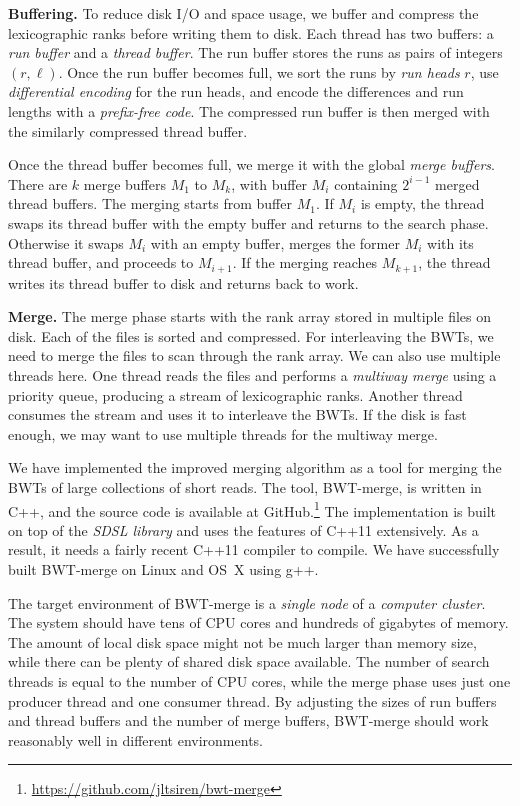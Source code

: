 \documentclass[smallabstract,smallcaptions]{dccpaper}
\newcommand{\BWT}{\textsf{BWT}}
\newcommand{\BWTmerge}{\textsf{BWT\nobreakdash-merge}}
\begin{document}
\smallbreak\noindent\textbf{Buffering.} To reduce disk I/O and space usage, we buffer and compress the lexicographic ranks before writing them to disk. Each thread has two buffers: a \emph{run buffer} and a \emph{thread buffer}. The run buffer stores the runs as pairs of integers $(r, \ell)$. Once the run buffer becomes full, we sort the runs by \emph{run heads} $r$, use \emph{differential encoding} for the run heads, and encode the differences and run lengths with a \emph{prefix-free code}. The compressed run buffer is then merged with the similarly compressed thread buffer.

Once the thread buffer becomes full, we merge it with the global \emph{merge buffers}. There are $k$ merge buffers $M_{1}$ to $M_{k}$, with buffer $M_{i}$ containing $2^{i-1}$ merged thread buffers. The merging starts from buffer $M_{1}$. If $M_{i}$ is empty, the thread swaps its thread buffer with the empty buffer and returns to the search phase. Otherwise it swaps $M_{i}$ with an empty buffer, merges the former $M_{i}$ with its thread buffer, and proceeds to $M_{i+1}$. If the merging reaches $M_{k+1}$, the thread writes its thread buffer to disk and returns back to work.

\smallbreak\noindent\textbf{Merge.} The merge phase starts with the rank array stored in multiple files on disk. Each of the files is sorted and compressed. For interleaving the \BWT{}s, we need to merge the files to scan through the rank array. We can also use multiple threads here. One thread reads the files and performs a \emph{multiway merge} using a priority queue, producing a stream of lexicographic ranks. Another thread consumes the stream and uses it to interleave the \BWT{}s. If the disk is fast enough, we may want to use multiple threads for the multiway merge.



We have implemented the improved merging algorithm as a tool for merging the \BWT{}s of large collections of short reads. The tool, \BWTmerge{}, is written in C++, and the source code is available at GitHub.\footnote{\url{https://github.com/jltsiren/bwt-merge}} The implementation is built on top of the \emph{SDSL library} \cite{Gog2014b} and uses the features of C++11 extensively. As a result, it needs a fairly recent C++11 compiler to compile. We have successfully built \BWTmerge{} on Linux and OS~X using g++.

The target environment of \BWTmerge{} is a \emph{single node} of a \emph{computer cluster}. The system should have tens of CPU cores and hundreds of gigabytes of memory. The amount of local disk space might not be much larger than memory size, while there can be plenty of shared disk space available. The number of search threads is equal to the number of CPU cores, while the merge phase uses just one producer thread and one consumer thread. By adjusting the sizes of run buffers and thread buffers and the number of merge buffers, \BWTmerge{} should work reasonably well in different environments.
\end{document}
